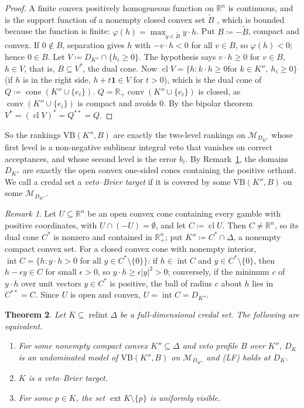 \documentclass[11pt]{article}
\newcommand{\R}{\mathbb{R}}
\newcommand{\one}{\mathbf{1}}
\newcommand{\M}{\mathcal{M}}
\newcommand{\VB}{\mathrm{VB}}
\DeclareMathOperator{\conv}{conv}
\DeclareMathOperator{\cone}{cone}
\DeclareMathOperator{\relint}{relint}
\DeclareMathOperator{\ext}{ext}
\DeclareMathOperator{\cl}{cl}
\DeclareMathOperator{\inter}{int}
\theoremstyle{plain}
\newtheorem{theorem}{Theorem}[section]
\theoremstyle{definition}
\theoremstyle{remark}
\newtheorem{remark}[theorem]{Remark}
\begin{document}
\begin{proof}
A finite convex positively homogeneous function on $\R^n$ is continuous, and is the
support function of a nonempty closed convex set $\tilde B$ \cite[Thm.~13.2]{Rockafellar}, %
which is bounded because the function is finite: $\varphi(h)=\max_{y\in\tilde B}y\cdot h$.
Put $B\coloneqq-\tilde B$, compact and convex. If $0\notin B$, separation
gives $h$ with $-v\cdot h<0$ for all $v\in B$, so $\varphi(h)<0$; hence $0\in B$. Let
$V\coloneqq D_{K''}\cap\{h_i\ge0\}$. The hypothesis says $v\cdot h\ge0$ for $v\in B$,
$h\in V$, that is, $B\subseteq V^\ast$, the dual cone. Now $\cl V=\{h:k\cdot h\ge0\text{
for }k\in K'',\ h_i\ge0\}$ (if $h$ is in the right side, $h+t\one\in V$ for $t>0$), which
is the dual cone of $Q\coloneqq\cone(K''\cup\{e_i\})$. $Q=\R_+\conv(K''\cup\{e_i\})$ is
closed, as $\conv(K''\cup\{e_i\})$ is compact and avoids $0$. By the bipolar theorem
$V^\ast=(\cl V)^\ast=Q^{\ast\ast}=Q$.
\end{proof}

So the rankings $\VB(K'',B)$ are exactly the two-level rankings on $\M_{D_{K''}}$ whose
first level is a non-negative sublinear integral veto that vanishes on correct
acceptances, and whose second level is the error $b_i$. By Remark~\ref{rem:convexU}, the
domains $D_{K''}$ are exactly the open convex one-sided cones containing the positive
orthant. We call a credal set a \emph{veto--Brier target} if it is covered by some
$\VB(K'',B)$ on some $\M_{D_{K''}}$.

\begin{remark}\label{rem:convexU}
Let $U\subseteq\R^n$ be an open convex cone containing every gamble with positive
coordinates, with $U\cap(-U)=\emptyset$, and let $C\coloneqq\cl U$. Then $C\neq\R^n$, so
its dual cone $C^\ast$ is nonzero and contained in $\R^n_+$; put $K''\coloneqq C^\ast\cap
\Delta$, a nonempty compact convex set. For a closed convex cone with nonempty interior,
$\inter C=\{h:y\cdot h>0\text{ for all }y\in C^\ast\setminus\{0\}\}$: if $h\in\inter C$ and
$y\in C^\ast\setminus\{0\}$, then $h-\epsilon y\in C$ for small $\epsilon>0$, so $y\cdot
h\ge\epsilon|y|^2>0$; conversely, if the minimum $c$ of $y\cdot h$ over unit vectors $y\in
C^\ast$ is positive, the ball of radius $c$ about $h$ lies in $C^{\ast\ast}=C$. Since $U$
is open and convex, $U=\inter C=D_{K''}$.
\end{remark}

\begin{theorem}\label{thm:reach}
Let $K\subseteq\relint\Delta$ be a full-dimensional credal set. The following are
equivalent.
\begin{enumerate}[label=(\alph*)]
  \item For some nonempty compact convex $K''\subseteq\Delta$ and veto profile $B$ over
  $K''$, $D_K$ is an undominated model of $\VB(K'',B)$ on $\M_{D_{K''}}$ and (LF) holds at
  $D_K$.
  \item $K$ is a veto--Brier target.
  \item For some $p\in K$, the set $\ext K\setminus\{p\}$ is uniformly visible.
\end{enumerate}
\end{theorem}
\end{document}
